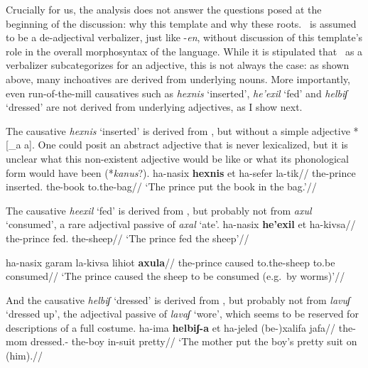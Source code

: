 Crucially for us, the analysis does not answer the questions posed at the beginning of the discussion: why this template and why these roots. \thif~is assumed to be a de-adjectival verbalizer, just like -\emph{en}, without discussion of this template's role in the overall morphosyntax of the language. While it is stipulated that \thif~as a verbalizer subcategorizes for an adjective, this is not always the case: as shown above, many inchoatives are derived from underlying nouns. More importantly, even run-of-the-mill causatives such as \emph{hexnis} `inserted', \emph{he'exil} `fed' and \emph{helbiʃ} `dressed' are not derived from underlying adjectives, as I show next.

The causative \emph{hexnis} `inserted' is derived from , but without a simple adjective *[_{a}  a]. One could posit an abstract adjective that is never lexicalized, but it is unclear what this non-existent adjective would be like or what its phonological form would have been (*\emph{kanus}?).
\ex \begingl
	\gla ha-nasix \textbf{hexnis} et ha-sefer la-tik//
	\glb the-prince inserted.  the-book to.the-bag//
	\glft `The prince put the book in the bag.'//
	\endgl
\xe

The causative \emph{heexil} `fed' is derived from , but probably not from \emph{axul} `consumed', a rare adjectival passive of \emph{axal} `ate'.
\pex
	\a \begingl
		\gla ha-nasix \textbf{he'exil} et ha-kivsa//
		\glb the-prince fed.  the-sheep//
		\glft `The prince fed the sheep'//
		\endgl
		
	\a \ljudge{$\ne$} \begingl
		\gla ha-nasix garam la-kivsa lihiot \textbf{axula}//
		\glb the-prince caused to.the-sheep to.be consumed//
		\glft `The prince caused the sheep to be consumed (e.g.~by worms)'//
		\endgl
\xe

And the causative \emph{helbiʃ} `dressed' is derived from , but probably not from \emph{lavuʃ} `dressed up', the adjectival passive of \emph{lavaʃ} `wore', which seems to be reserved for descriptions of a full costume.
\pex
	\a \begingl
		\gla ha-ima \textbf{helbiʃ-a} et ha-jeled (be-)xalifa jafa//
		\glb the-mom dressed.-  the-boy in-suit pretty//
		\glft `The mother put the boy's pretty suit on (him).//
		\endgl
	
